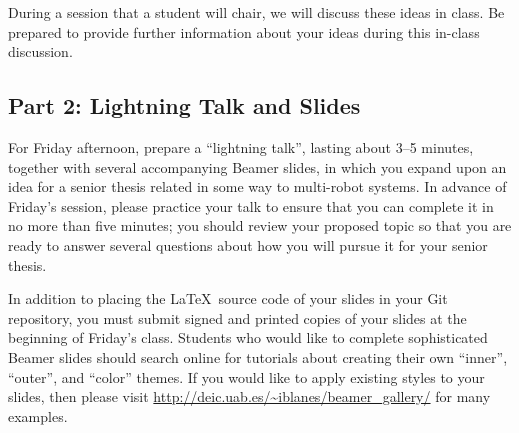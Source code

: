 During a session that a student will chair, we will discuss these ideas in class. Be prepared to provide further
information about your ideas during this in-class discussion.

\subsection*{Part 2: Lightning Talk and Slides}

For Friday afternoon, prepare a ``lightning talk'', lasting about 3--5 minutes, together with several accompanying
Beamer slides, in which you expand upon an idea for a senior thesis related in some way to multi-robot systems. In
advance of Friday's session, please practice your talk to ensure that you can complete it in no more than five minutes;
you should review your proposed topic so that you are ready to answer several questions about how you will pursue it for
your senior thesis.

In addition to placing the \LaTeX\ source code of your slides in your Git repository, you must submit signed and printed
copies of your slides at the beginning of Friday's class. Students who would like to complete sophisticated Beamer
slides should search online for tutorials about creating their own ``inner'', ``outer'', and ``color'' themes. If you
would like to apply existing styles to your slides, then please visit \url{http://deic.uab.es/~iblanes/beamer_gallery/}
for many examples.


